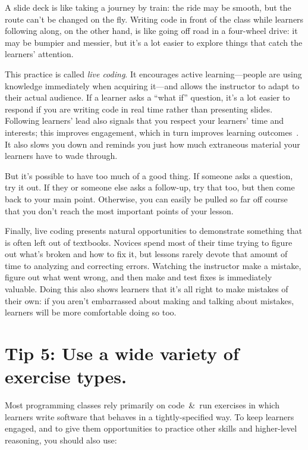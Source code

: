 \documentclass[10pt,letterpaper]{article}
\newcommand{\rulemajor}[1]{\section{#1}}
\begin{document}
A slide deck is like taking a journey by train:
the ride may be smooth,
but the route can't be changed on the fly.
Writing code in front of the class while learners following along,
on the other hand,
is like going off road in a four-wheel drive:
it may be bumpier and messier,
but it's a lot easier to explore things that catch the learners' attention.

This practice is called \emph{live coding}.
It encourages active learning---people are using knowledge immediately
when acquiring it---and allows the instructor to adapt to their actual audience.
If a learner asks a ``what if'' question,
it's a lot easier to respond if you are writing code in real time
rather than presenting slides.
Following learners' lead also signals that you respect your learners' time and interests;
this improves engagement,
which in turn improves learning outcomes~\cite{Wlod2017}.
It also slows you down
and reminds you just how much extraneous material your learners have to wade through.

But it's possible to have too much of a good thing.
If someone asks a question, try it out.
If they or someone else asks a follow-up,
try that too,
but then come back to your main point.
Otherwise,
you can easily be pulled so far off course that
you don't reach the most important points of your lesson.

Finally,
live coding presents natural opportunities to demonstrate something that is often left out of textbooks.
Novices spend most of their time trying to figure out what's broken and how to fix it,
but lessons rarely devote that amount of time to analyzing and correcting errors.
Watching the instructor make a mistake,
figure out what went wrong,
and then make and test fixes is immediately valuable.
Doing this also shows learners that it's all right to make mistakes of their own:
if you aren't embarrassed about making and talking about mistakes,
learners will be more comfortable doing so too.

\rulemajor{Tip 5: Use a wide variety of exercise types.}

Most programming classes rely primarily on code~\&~run exercises
in which learners write software that behaves in a tightly-specified way.
To keep learners engaged,
and to give them opportunities to practice other skills and higher-level reasoning,
you should also use:
\end{document}

